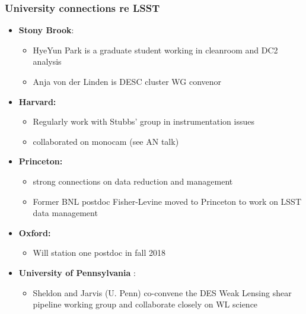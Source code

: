 \documentclass[aspectratio=169]{beamer}
\begin{document}
\begin{frame}
  \frametitle{University connections re LSST}

  \begin{itemize}


    \item \textbf{Stony Brook}:
      \begin{itemize}
      \item HyeYun Park is a graduate student working in cleanroom and
        DC2 analysis
      \item Anja von der Linden is DESC cluster WG convenor
      \end{itemize}


    \item \textbf{Harvard:}
      \begin{itemize}
      \item Regularly work with Stubbs' group in instrumentation
        issues
      \item collaborated on monocam (see AN talk)
      \end{itemize}

    \item \textbf{Princeton:}
      \begin{itemize}
      \item strong connections on data reduction and management
      \item Former BNL postdoc Fisher-Levine moved to Princeton to
        work on LSST data management
      \end{itemize}
    \item \textbf{Oxford:}
      \begin{itemize}
      \item Will station one postdoc in fall 2018
      \end{itemize}

    \item \textbf{University of Pennsylvania }:
      \begin{itemize}
          \item Sheldon and Jarvis (U. Penn) co-convene the DES Weak Lensing 
              shear pipeline working group and collaborate closely on WL science
      \end{itemize}


\end{itemize}
\end{frame}
\end{document}
